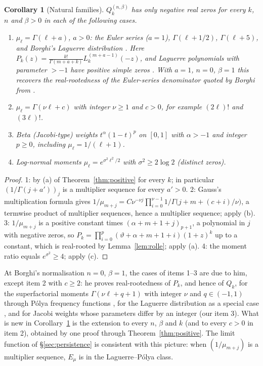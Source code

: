 \documentclass[11pt,a4paper]{article}
\newtheorem{corollary}[theorem]{Corollary}
\theoremstyle{definition}
\theoremstyle{remark}
\begin{document}
\begin{corollary}[Natural families]\label{cor:families}
$Q_k^{(n,\beta)}$ has only negative real zeros for every $k$, $n$ and
$\beta>0$ in each of the following cases.
\begin{enumerate}
\item $\mu_\ell=\Gamma(\ell+a)$, $a>0$: the Euler series ($a=1$),
$\Gamma(\ell+1/2)$, $\Gamma(\ell+5)$, and Borghi's Laguerre distribution
\cite[\S4.3]{Borghi2026}. Here $P_k(z)=\frac{k!}{\Gamma(m+a+k)}L_k^{(m+a-1)}(-z)$,
and Laguerre polynomials with parameter $>-1$ have positive simple zeros
\cite[Thm.~3.3.1]{Szego1939}. With $a=1$, $n=0$, $\beta=1$ this recovers the
real-rootedness of the Euler-series denominator quoted by Borghi from
\cite[Thm.~5.1]{BorghiWeniger2015}.
\item $\mu_\ell=\Gamma(\nu\ell+c)$ with integer $\nu\ge1$ and $c>0$, for
example $(2\ell)!$ and $(3\ell)!$.
\item Beta (Jacobi-type) weights $t^\alpha(1-t)^{p}$ on $[0,1]$ with
$\alpha>-1$ and integer $p\ge0$, including $\mu_\ell=1/(\ell+1)$.
\item Log-normal moments $\mu_\ell=e^{\sigma^2\ell^2/2}$ with
$\sigma^2\ge2\log2$ (distinct zeros).
\end{enumerate}
\end{corollary}
\begin{proof}
1: by (a) of Theorem~\ref{thm:positive} for every $k$; in particular
$(1/\Gamma(j+a'))_j$ is a multiplier sequence for every $a'>0$.
2: Gauss's multiplication formula gives
$1/\mu_{m+j}=C\nu^{-\nu j}\prod_{i=0}^{\nu-1}1/\Gamma\bigl(j+m+(c+i)/\nu\bigr)$, a
termwise product of multiplier sequences, hence a multiplier sequence;
apply (b). 3: $1/\mu_{m+j}$ is a positive constant times
$(\alpha+m+1+j)_{p+1}$, a polynomial in $j$ with negative zeros, so
$P_k=\prod_{i=0}^{p}(\vartheta+\alpha+m+1+i)(1+z)^k$ up to a constant, which is
real-rooted by Lemma~\ref{lem:rolle}; apply (a). 4: the moment ratio equals
$e^{\sigma^2}\ge4$; apply (c).
\end{proof}

At Borghi's normalisation $n=0$, $\beta=1$, the cases of items 1--3 are due
to him, except item 2 with $c\ge2$: he proves
real-rootedness of $P_k$, and hence of $Q_k$, for the superfactorial
moments $\Gamma(\nu\ell+q+1)$ with integer $\nu$ and $q\in(-1,1)$ through
Pólya frequency functions \cite[\S4.2]{Borghi2026}, for the Laguerre
distribution as a special case \cite[\S4.3]{Borghi2026}, and for Jacobi
weights whose parameters differ by an integer \cite[\S4.6]{Borghi2026}
(our item 3). What is new in Corollary~\ref{cor:families} is the
extension to every $n$, $\beta$ and $k$ (and to every $c>0$ in item 2),
obtained by one proof through Theorem~\ref{thm:positive}. The limit function of \S\ref{sec:persistence} is consistent with
this picture: when $(1/\mu_{m+j})$ is a multiplier sequence, $E_\mu$ is in the
Laguerre--Pólya class.
\end{document}
